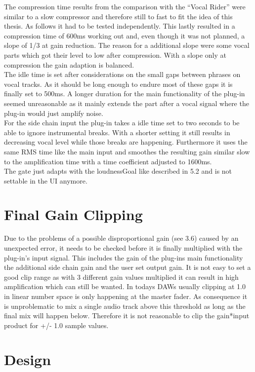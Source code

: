 The compression time results from the comparison with the “Vocal Rider” were similar to a slow compressor and therefore still to fast to fit the idea of this thesis. As follows it had to be tested independently. This lastly resulted in a compression time of 600ms working out and, even though it was not planned, a slope of 1/3 at gain reduction. The reason for a additional slope were some vocal parts which got their level to low after compression. With a slope only at compression the gain adaption is balanced.\\
The idle time is set after considerations on the small gaps between phrases on vocal tracks. As it should be long enough to endure most of these gaps it is finally set to 500ms. A longer duration for the main functionality of the plug-in seemed unreasonable as it mainly extends the part after a vocal signal where the plug-in would just amplify noise.\\
For the side chain input the plug-in takes a idle time set to two seconds to be able to ignore instrumental breaks. With a shorter setting it still results in decreasing vocal level while those breaks are happening. Furthermore it uses the same RMS time like the main input and smoothes the resulting gain similar slow to the amplification time with a time coefficient adjusted to 1600ms.\\
The gate just adapts with the loudnessGoal like described in 5.2 and is not settable in the UI anymore.\\

\section{Final Gain Clipping}

Due to the problems of a possible disproportional gain (see 3.6) caused by an unexpected error, it needs to be checked before it is finally multiplied with the plug-in’s input signal. This includes the gain of the plug-ins main functionality the additional side chain gain and the user set output gain. It is not easy to set a good clip range as with 3 different gain values multiplied it can result in high amplification which can still be wanted. In todays DAWs usually clipping at 1.0 in linear number space is only happening at the master fader. As consequence it is unproblematic to mix a single audio track above this threshold as long as the final mix will happen below. Therefore it is not reasonable to clip the gain*input product for +/- 1.0 sample values.\\

\section{Design}

